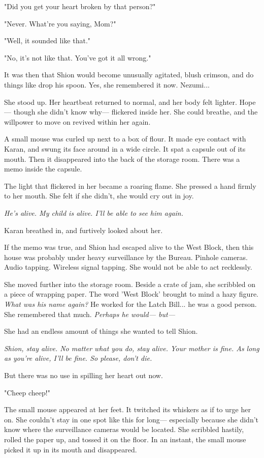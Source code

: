 "Did you get your heart broken by that person?"

"Never. What're you saying, Mom?"

"Well, it sounded like that."

"No, it's not like that. You've got it all wrong."

It was then that Shion would become unusually agitated, blush crimson,
and do things like drop his spoon. Yes, she remembered it now. Nezumi...

She stood up. Her heartbeat returned to normal, and her body felt
lighter. Hope--- though she didn't know why--- flickered inside her. She
could breathe, and the willpower to move on revived within her again.

A small mouse was curled up next to a box of flour. It made eye contact
with Karan, and swung its face around in a wide circle. It spat a
capsule out of its mouth. Then it disappeared into the back of the
storage room. There was a memo inside the capsule.


The light that flickered in her became a roaring flame. She pressed a
hand firmly to her mouth. She felt if she didn't, she would cry out in
joy.

\emph{He's alive. My child is alive. I'll be able to see him again.}

Karan breathed in, and furtively looked about her.

If the memo was true, and Shion had escaped alive to the West Block,
then this house was probably under heavy surveillance by the Bureau.
Pinhole cameras. Audio tapping. Wireless signal tapping. She would not
be able to act recklessly.

She moved further into the storage room. Beside a crate of jam, she
scribbled on a piece of wrapping paper. The word 'West Block' brought to
mind a hazy figure. \emph{What was his name again?} He worked for the Latch
Bill... he was a good person. She remembered that much. \emph{Perhaps he
would--- but---}

She had an endless amount of things she wanted to tell Shion.

\emph{Shion, stay alive. No matter what you do, stay alive. Your mother is
fine. As long as you're alive, I'll be fine. So please, don't die.}

But there was no use in spilling her heart out now.

"Cheep cheep!"

The small mouse appeared at her feet. It twitched its whiskers as if to
urge her on. She couldn't stay in one spot like this for long---
especially because she didn't know where the surveillance cameras would
be located. She scribbled hastily, rolled the paper up, and tossed it on
the floor. In an instant, the small mouse picked it up in its mouth and
disappeared.

